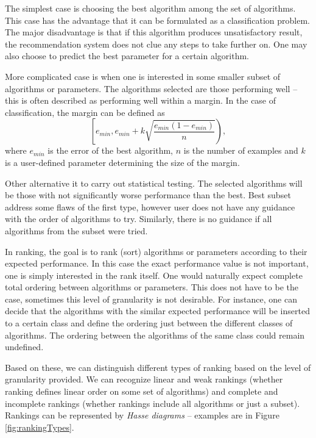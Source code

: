 The simplest case is choosing the best algorithm among the set of algorithms. This case has the advantage that it can be formulated as a classification problem. The major disadvantage is that if this algorithm produces unsatisfactory result, the recommendation system does not clue any steps to take further on. One may also choose to predict the best parameter for a certain algorithm.

More complicated case is when one is interested in some smaller subset of algorithms or parameters. The algorithms selected are those performing well -- this is often described as performing well within a margin. In the case of classification, the margin can be defined as 
\begin{equation}
\left[ e_{min}, e_{min}+k\sqrt{\frac{e_{min}(1-e_{min})}{n}} \right),
\end{equation}
where $e_{min}$ is the error of the best algorithm, $n$ is the number of examples and $k$ is a user-defined parameter determining the size of the margin.

Other alternative it to carry out statistical testing. The selected algorithms  will be those with not significantly worse performance than the best. Best subset address some flaws of the first type, however user does not have any guidance with the order of algorithms to try. Similarly, there is no guidance if all algorithms from the subset were tried.

In ranking, the goal is to rank (sort) algorithms or parameters according to their expected performance. In this case the exact performance value is not important, one is simply interested in the rank itself. One would naturally expect complete total ordering between algorithms or parameters. This does not have to be the case, sometimes this level of granularity is not desirable. For instance, one can decide that the algorithms with the similar expected performance will be inserted to a certain class and define the ordering just between the different classes of algorithms. The ordering between the algorithms of the same class could remain undefined. 

Based on these, we can distinguish different types of ranking based on the level of granularity provided. We can recognize linear and weak rankings (whether ranking defines linear order on some set of algorithms) and complete and incomplete rankings (whether rankings include all algorithms or just a subset). Rankings can be represented by \emph{Hasse diagrams} -- examples are in Figure \ref{fig:rankingTypes}.

